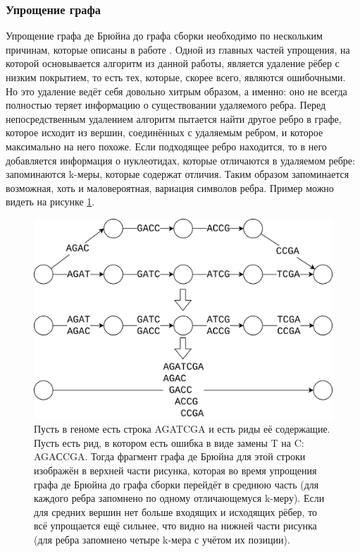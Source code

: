 \documentclass[14pt]{matmex-diploma-custom}
\begin{document}
\subsubsection{Упрощение графа}

Упрощение графа де Брюйна до графа сборки необходимо по нескольким причинам, которые описаны в работе \cite{art:disser_andrey}. Одной из главных частей упрощения, на которой основывается алгоритм из данной работы, является удаление рёбер с низким покрытием, то есть тех, которые, скорее всего, являются ошибочными. Но это удаление ведёт себя довольно хитрым образом, а именно: оно не всегда полностью теряет информацию о существовании удаляемого ребра. Перед непосредственным удалением алгоритм пытается найти другое ребро в графе, которое исходит из вершин, соединённых с удаляемым ребром, и которое максимально на него похоже. Если подходящее ребро находится, то в него добавляется информация о нуклеотидах, которые отличаются в удаляемом ребре: запоминаются k-меры, которые содержат отличия. Таким образом запоминается возможная, хоть и маловероятная, вариация символов ребра. Пример можно видеть на рисунке \ref{fig:simpl}.
\begin{figure}[h]
	\centering
	\includegraphics[scale=0.2]{simpl.png}
	\caption{Пусть в геноме есть строка AGATCGA и есть риды её содержащие. Пусть есть рид, в котором есть ошибка в виде замены T на C: AGAСCGA. Тогда фрагмент графа де Брюйна для этой строки изображён в верхней части рисунка, которая во время упрощения графа де Брюйна до графа сборки перейдёт в среднюю часть (для каждого ребра запомнено по одному отличающемуся k-меру). Если для средних вершин нет больше входящих и исходящих рёбер, то всё упрощается ещё сильнее, что видно на нижней части рисунка (для ребра запомнено четыре k-мера с учётом их позиции).}
  	\label{fig:simpl}
\end{figure}
\end{document}
